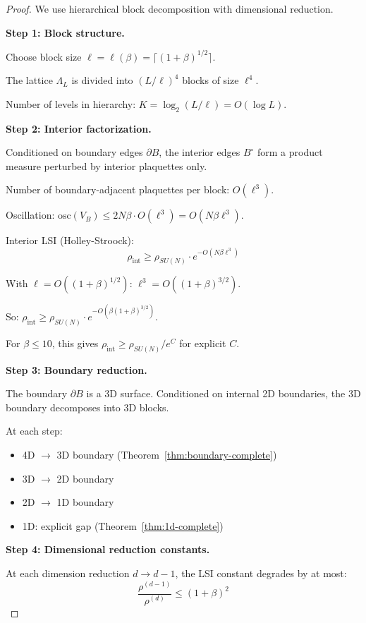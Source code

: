 \begin{proof}
We use hierarchical block decomposition with dimensional reduction.

\textbf{Step 1: Block structure.}

Choose block size $\ell = \ell(\beta) = \lceil (1+\beta)^{1/2} \rceil$.

The lattice $\Lambda_L$ is divided into $(L/\ell)^4$ blocks of size $\ell^4$.

Number of levels in hierarchy: $K = \log_2(L/\ell) = O(\log L)$.

\textbf{Step 2: Interior factorization.}

Conditioned on boundary edges $\partial B$, the interior edges $B^\circ$ form 
a product measure perturbed by interior plaquettes only.

Number of boundary-adjacent plaquettes per block: $O(\ell^3)$.

Oscillation: $\text{osc}(V_B) \leq 2N\beta \cdot O(\ell^3) = O(N\beta\ell^3)$.

Interior LSI (Holley-Stroock):
\begin{equation}
\rho_{\text{int}} \geq \rho_{SU(N)} \cdot e^{-O(N\beta\ell^3)}
\end{equation}

With $\ell = O((1+\beta)^{1/2})$: $\ell^3 = O((1+\beta)^{3/2})$.

So: $\rho_{\text{int}} \geq \rho_{SU(N)} \cdot e^{-O(\beta(1+\beta)^{3/2})}$.

For $\beta \leq 10$, this gives $\rho_{\text{int}} \geq \rho_{SU(N)} / e^{C}$ for 
explicit $C$.

\textbf{Step 3: Boundary reduction.}

The boundary $\partial B$ is a 3D surface. Conditioned on internal 2D boundaries, 
the 3D boundary decomposes into 3D blocks.

At each step:
\begin{itemize}
\item 4D $\to$ 3D boundary (Theorem~\ref{thm:boundary-complete})
\item 3D $\to$ 2D boundary
\item 2D $\to$ 1D boundary
\item 1D: explicit gap (Theorem~\ref{thm:1d-complete})
\end{itemize}

\textbf{Step 4: Dimensional reduction constants.}

At each dimension reduction $d \to d-1$, the LSI constant degrades by at most:
\begin{equation}
\frac{\rho^{(d-1)}}{\rho^{(d)}} \leq (1+\beta)^2
\end{equation}


\end{proof}
